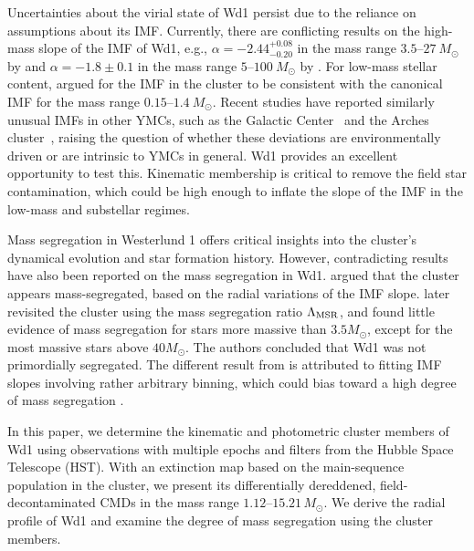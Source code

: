 \documentclass[12pt]{ucsddissertation}
\begin{document}
\begin{CJK*}{UTF8}{gbsn}
Uncertainties about the virial state of Wd1 persist due to the reliance on assumptions about its IMF. Currently, there are conflicting results on the high-mass slope of the IMF of Wd1, e.g., $\alpha=-2.44^{+0.08}_{-0.20}$ in the mass range $3.5$--$27~M_\odot$ by \citet{Gennaro-2011} and $\alpha=-1.8\pm0.1$ in the mass range $5$--$100~M_\odot$  by \citet{Lim-2013}. For low-mass stellar content, \citet{Andersen-2017} argued for the IMF in the cluster to be consistent with the canonical IMF for the mass range $0.15$--$1.4~M_\odot$. Recent studies have reported similarly unusual IMFs in other YMCs, such as the Galactic Center~\citep{Lu-2013} and the Arches cluster~\citep{Hosek-2019}, raising the question of whether these deviations are environmentally driven or are intrinsic to YMCs in general. Wd1 provides an excellent opportunity to test this. Kinematic membership is critical to remove the field star contamination, which could be high enough to inflate the slope of the IMF in the low-mass and substellar regimes. 

Mass segregation in Westerlund 1 offers critical insights into the cluster’s dynamical evolution and star formation history. However, contradicting results have also been reported on the mass segregation in Wd1. \citet{Gennaro-2011} argued that the cluster appears mass-segregated, based on the radial variations of the IMF slope.  \citet{Gennaro-2017} later revisited the cluster using the mass segregation ratio $\Lambda_{\rm MSR}$, and found little evidence of mass segregation for stars more massive than $3.5M_\odot$, except for the most massive stars above $40M_\odot$. The authors concluded that Wd1 was not primordially segregated. The different result from \citep{Gennaro-2011} is attributed to fitting IMF slopes involving rather arbitrary binning, which could bias toward a high degree of mass segregation \citep[][]{Gennaro-2017}. \citet{Cottaar-2012}

In this paper, we determine the kinematic and photometric cluster members of Wd1 using observations with multiple epochs and filters from the Hubble Space Telescope (HST). With an extinction map based on the main-sequence population in the cluster, we present its differentially dereddened, field-decontaminated CMDs in the mass range $1.12$--$15.21\,M_\odot$. We derive the radial profile of Wd1 and examine the degree of mass segregation using the cluster members.


\end{CJK*}
\end{document}
